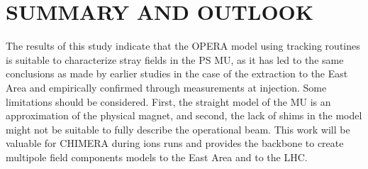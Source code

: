 \documentclass[a4paper,
               biblatex,     %
               keeplastbox,   %
               ]{jacow}
\begin{document}


\section{SUMMARY AND OUTLOOK}
The results of this study indicate that the OPERA model using tracking routines is suitable to characterize stray fields in the PS MU, as it has led to the same conclusions as made by earlier studies in the case of the extraction to the East Area and empirically confirmed through measurements at injection. Some limitations should be considered. First, the straight model of the MU is an approximation of the physical magnet, and second, the lack of shims in the model might not be suitable to fully describe the operational beam. This work will be valuable for CHIMERA during ions runs and provides the backbone to create multipole field components models to the East Area and to the LHC.

\printbibliography
\end{document}
